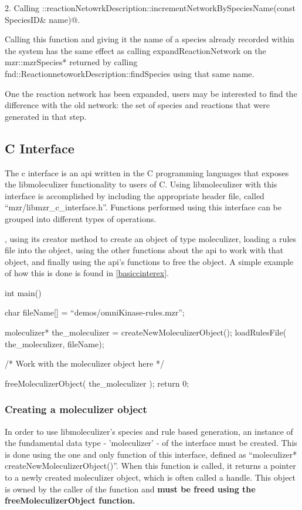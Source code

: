 2.  Calling
\lstinline@fnd::reactionNetowrkDescription::incrementNetworkBySpeciesName(const SpeciesID& name)@.  

Calling this function and giving it the name of a species already
recorded within the system has the same effect as calling
expandReactionNetwork on the mzr::mzrSpecies* returned by calling
fnd::ReactionnetoworkDescription::findSpecies using that same name. 

One the reaction network has been expanded, users may be interested to
find the difference with the old network: the set of species and
reactions that were generated in that step.  





\subsection{C Interface}
The c interface is an api written in the C programming languages
that exposes the libmoleculizer functionality to users of C.  Using
libmoleculizer with this interface is accomplished by including the
appropriate header file, called ``mzr/libmzr_c_interface.h''.
Functions performed using this interface can be grouped into
different types of operations.

, using
its creator method to create an object of type moleculizer, loading a
rules file into the object, using the other functions about the api to
work with that object, and finally using the api's functions to free
the object.  A simple example of how this is done is found in \ref{basiccinterex}.

\begin{ExampleC}[caption=Basic example using the c-interface, label=basiccinterex]
  int main(){
    char fileName[] = ``demos/omniKinase-rules.mzr'';
    
    moleculizer* the_moleculizer = createNewMoleculizerObject();
    loadRulesFile( the_moleculizer, fileName);

    /* Work with the moleculizer object here */

    freeMoleculizerObject( the_moleculizer );
    return 0;
    }
\end{ExampleC}

\subsubsection{Creating a moleculizer object}
In order to use libmoleculizer's species and rule based generation,
an instance of the fundamental data type - 'moleculizer' - of the
interface must be created.  This is done using the one and only
function of this interface, defined as ``moleculizer*
createNewMoleculizerObject()''.  When this function is called, it
returns a pointer to a newly created moleculizer object, which is
often called a handle.  This object is owned by the caller of the
function and \bf{must} be freed using the freeMoleculizerObject
function.

